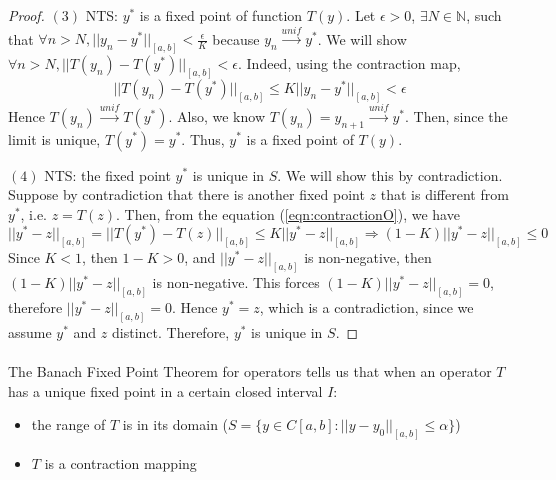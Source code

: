 \documentclass{article}
\theoremstyle{definition}
\theoremstyle{remark}
\theoremstyle{example}
\begin{document}
\begin{proof}
    $(3)$ NTS: $y^{*}$ is a fixed point of function $T(y)$. \; Let $\epsilon > 0$, $\exists N \in \mathbb{N}$, such that $\forall n > N, \lvert\lvert y_n - y^{*} \rvert\rvert_{[a,b]} < \tfrac{\epsilon}{K}$ because $y_n \xrightarrow{unif} y^{*}$. We will show $\forall n > N, \lvert\lvert T(y_n) - T(y^{*}) \rvert\rvert_{[a,b]} < \epsilon$. Indeed, using the contraction map,
    \begin{equation}
        \lvert\lvert T(y_n) - T(y^{*}) \rvert\rvert_{[a,b]} \leq K \lvert\lvert y_n - y^{*} \rvert\rvert_{[a,b]} < \epsilon
    \end{equation}
    Hence $T(y_n) \xrightarrow{unif} T(y^{*})$. Also, we know $T(y_n) = y_{n+1} \xrightarrow{unif} y^{*}$. Then, since the limit is unique, $T(y^{*}) = y^{*}$. Thus, $y^{*}$ is a fixed point of $T(y)$.
    
    $(4)$ NTS: the fixed point $y^{*}$ is unique in $S$. \; We will show this by contradiction. Suppose by contradiction that there is another fixed point $z$ that is different from $y^{*}$, i.e. $z = T(z)$. Then, from the equation (\ref{eqn:contractionO}), we have
    \begin{equation}
        \lvert\lvert y^{*} - z \rvert\rvert_{[a,b]} =\lvert\lvert T(y^{*}) - T(z) \rvert\rvert_{[a,b]} \leq K \lvert\lvert y^{*} - z \rvert\rvert_{[a,b]} \Rightarrow (1-K)\lvert\lvert y^{*} - z \rvert\rvert_{[a,b]} \leq 0
    \end{equation}
    Since $K < 1$, then $1 - K > 0$, and $\lvert\lvert y^{*} - z \rvert\rvert_{[a,b]}$ is non-negative, then $(1-K)\lvert\lvert y^{*} - z \rvert\rvert_{[a,b]}$ is non-negative. This forces $(1-K)\lvert\lvert y^{*} - z \rvert\rvert_{[a,b]} = 0$, therefore $\lvert\lvert y^{*} - z\rvert\rvert_{[a,b]} = 0$. Hence $y^{*} = z$, which is a contradiction, since we assume $y^{*}$ and $z$ distinct. Therefore, $y^{*}$ is unique in $S$.
\end{proof}

\paragraph{   }

The Banach Fixed Point Theorem for operators tells us that when an operator $T$ has a unique fixed point in a certain closed interval $I$:
\begin{itemize}
    \item the range of $T$ is in its domain ($S = \{y\in C[a,b]:\lvert\lvert y - y_0\rvert\rvert_{[a,b]} \leq \alpha\}$)
    \item $T$ is a contraction mapping
\end{itemize}
\end{document}
